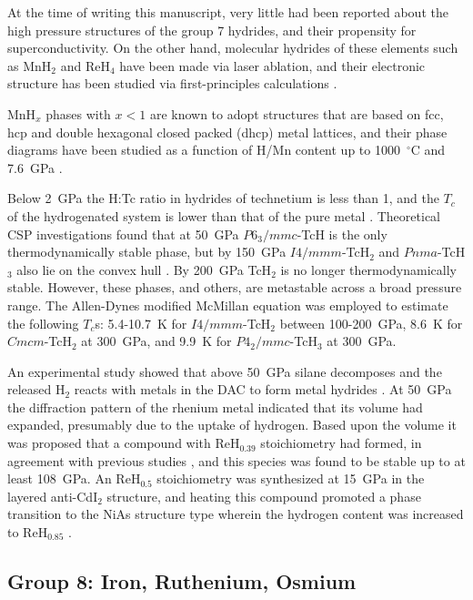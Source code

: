 \documentclass[12pt,letterpaper,oneside]{article}
\begin{document}
At the time of writing this manuscript, very little had been reported about the high pressure structures of the group 7 hydrides, and their propensity for superconductivity. On the other hand, molecular hydrides of these elements such as MnH$_2$ and ReH$_4$ have been made via laser ablation, and their electronic structure has been studied via first-principles calculations \cite{Wang:2003a}. 

MnH$_x$ phases with $x<1$ are known to adopt structures that are based on fcc, hcp and double hexagonal closed packed (dhcp) metal lattices, and their phase diagrams have been studied as a function of H/Mn content up to 1000~$^\circ$C and 7.6~GPa \cite{Antonov:1996,Fukai:2002}. 

Below 2~GPa the H:Tc ratio in hydrides of technetium is less than 1, and the $T_c$ of the hydrogenated system is lower than that of the pure metal \cite{Antonov:1989,Spitsyn:1982}. Theoretical CSP investigations found that at 50~GPa $P6_3/mmc$-TcH is the only thermodynamically stable phase, but by 150~GPa $I4/mmm$-TcH$_2$ and $Pnma$-TcH$_3$ also lie on the convex hull \cite{Li:2016}. By 200~GPa TcH$_2$ is no longer thermodynamically stable. However, these phases, and others, are metastable across a broad pressure range. The Allen-Dynes modified McMillan equation was employed to estimate the following $T_c$s: 5.4-10.7~K for $I4/mmm$-TcH$_2$ between 100-200~GPa, 8.6~K for $Cmcm$-TcH$_2$ at 300~GPa, and 9.9~K for $P4_2/mmc$-TcH$_3$ at 300~GPa.

An experimental study showed that above 50~GPa silane decomposes and the released H$_2$ reacts with  metals in the DAC to form metal hydrides \cite{Degtyareva:2009a}.  At 50~GPa the diffraction pattern of the rhenium metal indicated that its volume had expanded, presumably due to the uptake of hydrogen. Based upon the volume it was proposed that a compound with ReH$_{0.39}$ stoichiometry had formed, in agreement with previous studies \cite{Atou:1995}, and this species was found to be stable up to at least 108~GPa. An ReH$_{0.5}$ stoichiometry was synthesized at 15~GPa in the layered anti-CdI$_2$ structure, and heating this compound promoted a phase transition to the NiAs structure type wherein the hydrogen content was increased to ReH$_{0.85}$ \cite{Scheler:2011b}.

\subsection{Group 8: Iron, Ruthenium, Osmium} 
\end{document}
